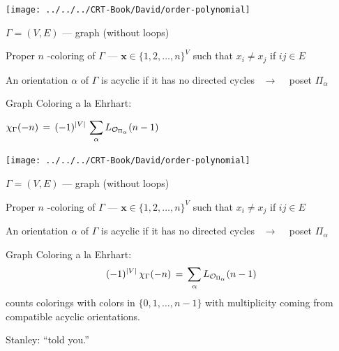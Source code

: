 \documentclass[landscape]{foils}
\def\green{\color{green}}
\def\red{\color{red}}
\def\blue{\color{blue}}
\def\black{\color{black}}
\def\bm{\blue $}
\def\em{$ \black }
\def\be{\blue \[}
\def\ee{\] \black}                               %
\def\x{{\boldsymbol x}}
\begin{document}
\vspace{-1.3in}
\hspace{3.4in}
\texttt{[image: ../../../CRT-Book/David/order-polynomial]}



\bm \Gamma = (V,E) \em --- graph (without loops)

\red Proper \bm n \em\!\!\red-coloring \black of \bm \Gamma \em --- \bm \x \in \{ 1, 2, \dots, n \}^V \em such that \bm x_i \not= x_j \em if \bm ij \in E \em

An orientation \bm \alpha \em of \bm \Gamma \em is \red acyclic \black if it has no directed cycles
\ \green $\longrightarrow$ \ \black
poset \bm \Pi_\alpha \em

Graph Coloring a la Ehrhart: \

\bm \displaystyle \chi_\Gamma (-n) \, = \, (-1)^{ |V| } \, \sum_{ \alpha } L_{\OP_{\Pi_\alpha}} (n-1) \em

\vspace{-1.3in}
\hspace{3.4in}
\texttt{[image: ../../../CRT-Book/David/order-polynomial]}



\bm \Gamma = (V,E) \em --- graph (without loops)

\red Proper \bm n \em\!\!\red-coloring \black of \bm \Gamma \em --- \bm \x \in \{ 1, 2, \dots, n \}^V \em such that \bm x_i \not= x_j \em if \bm ij \in E \em

An orientation \bm \alpha \em of \bm \Gamma \em is \red acyclic \black if it has no directed cycles
\ \green $\longrightarrow$ \ \black
poset \bm \Pi_\alpha \em

Graph Coloring a la Ehrhart: \
%
\be \displaystyle (-1)^{ |V| } \, \chi_\Gamma (-n) \, = \, \sum_{ \alpha } L_{\OP_{\Pi_\alpha}} (n-1) \ee
%
counts colorings with colors in \bm \{ 0, 1, \dots, n-1 \} \em with multiplicity coming from
compatible acyclic orientations.

Stanley: ``told you.''


\foilhead{\green Recap Day III}
\end{document}
